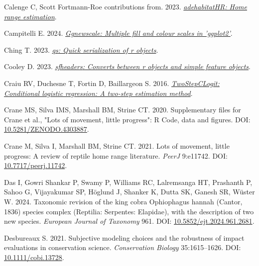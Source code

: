 \documentclass[10pt,a4paper]{article}
\newlength{\cslhangindent}
\newenvironment{CSLReferences}[2] %
 {\begin{list}{}{%
  \setlength{\itemindent}{0pt}
  \setlength{\leftmargin}{0pt}
  \setlength{\parsep}{0pt}
  \ifodd #1
   \setlength{\leftmargin}{\cslhangindent}
   \setlength{\itemindent}{-1\cslhangindent}
  \fi
  \setlength{\itemsep}{#2\baselineskip}}}
 {\end{list}}
\begin{document}
\begin{CSLReferences}{1}{0}
Calenge C, Scott Fortmann-Roe contributions from. 2023. \emph{\href{https://CRAN.R-project.org/package=adehabitatHR}{{adehabitatHR}: Home range estimation}}.

Campitelli E. 2024. \emph{\href{https://CRAN.R-project.org/package=ggnewscale}{Ggnewscale: Multiple fill and colour scales in 'ggplot2'}}.

Ching T. 2023. \emph{\href{https://CRAN.R-project.org/package=qs}{{qs}: Quick serialization of r objects}}.

Cooley D. 2023. \emph{\href{https://CRAN.R-project.org/package=sfheaders}{{sfheaders}: Converts between r objects and simple feature objects}}.

Craiu RV, Duchesne T, Fortin D, Baillargeon S. 2016. \emph{\href{https://CRAN.R-project.org/package=TwoStepCLogit}{TwoStepCLogit: Conditional logistic regression: A two-step estimation method}}.

Crane MS, Silva IMS, Marshall BM, Strine CT. 2020. Supplementary files for {Crane} et al., "{Lots} of movement, little progress": {R} {Code}, data and figures. DOI: \href{https://doi.org/10.5281/ZENODO.4303887}{10.5281/ZENODO.4303887}.

Crane M, Silva I, Marshall BM, Strine CT. 2021. Lots of movement, little progress: A review of reptile home range literature. \emph{PeerJ} 9:e11742. DOI: \href{https://doi.org/10.7717/peerj.11742}{10.7717/peerj.11742}.

Das I, Gowri Shankar P, Swamy P, Williams RC, Lalremsanga HT, Prashanth P, Sahoo G, Vijayakumar SP, Höglund J, Shanker K, Dutta SK, Ganesh SR, Wüster W. 2024. Taxonomic revision of the king cobra {Ophiophagus} hannah ({Cantor}, 1836) species complex ({Reptilia}: {Serpentes}: {Elapidae}), with the description of two new species. \emph{European Journal of Taxonomy} 961. DOI: \href{https://doi.org/10.5852/ejt.2024.961.2681}{10.5852/ejt.2024.961.2681}.

Desbureaux S. 2021. Subjective modeling choices and the robustness of impact evaluations in conservation science. \emph{Conservation Biology} 35:1615--1626. DOI: \href{https://doi.org/10.1111/cobi.13728}{10.1111/cobi.13728}.


\end{CSLReferences}
\end{document}

